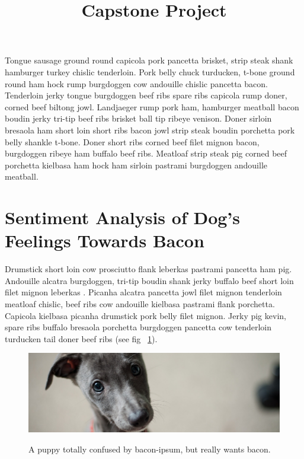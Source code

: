 \documentclass[man,floatsintext]{apa7}
\begin{document}
\title{Capstone Project}
\shorttitle{}





\maketitle
Tongue sausage ground round capicola pork pancetta brisket, strip steak shank hamburger turkey chislic tenderloin. Pork belly chuck turducken, t-bone ground round ham hock rump burgdoggen cow andouille chislic pancetta bacon. Tenderloin jerky tongue burgdoggen beef ribs spare ribs capicola rump doner, corned beef biltong jowl. Landjaeger rump pork ham, hamburger meatball bacon boudin jerky tri-tip beef ribs brisket ball tip ribeye venison. Doner sirloin bresaola ham short loin short ribs bacon jowl strip steak boudin porchetta pork belly shankle t-bone. Doner short ribs corned beef filet mignon bacon, burgdoggen ribeye ham buffalo beef ribs. Meatloaf strip steak pig corned beef porchetta kielbasa ham hock ham sirloin pastrami burgdoggen andouille meatball.

\newpage

\section{Sentiment Analysis of Dog's Feelings Towards Bacon}

Drumstick short loin cow prosciutto flank leberkas pastrami pancetta ham pig. Andouille alcatra burgdoggen, tri-tip boudin shank jerky buffalo beef short loin filet mignon leberkas \parencite{RN175} . Picanha alcatra pancetta jowl filet mignon tenderloin meatloaf chislic, beef ribs cow andouille kielbasa pastrami flank porchetta. Capicola kielbasa picanha drumstick pork belly filet mignon. Jerky pig kevin, spare ribs buffalo bresaola porchetta burgdoggen pancetta cow tenderloin turducken tail doner beef ribs (see fig ~\ref{fig:my_fig}). 

\begin{figure}[!ht]
  \centering
  \caption{A puppy totally confused by bacon-ipsum, but really wants bacon.}
  \includegraphics[width=\textwidth]{dog.jpg}
  \label{fig:my_fig}
\end{figure}

\printbibliography
\end{document}
